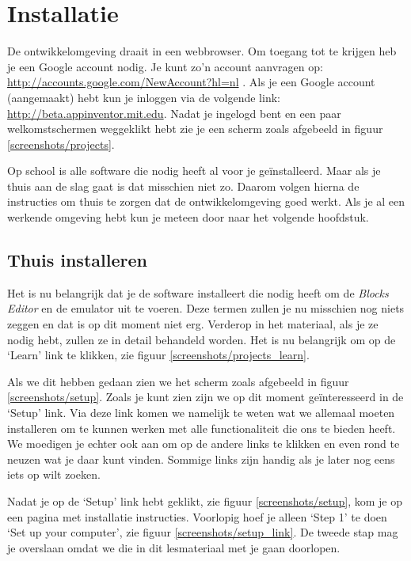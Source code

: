 \chapter{Installatie}

De \ai ontwikkelomgeving draait in een webbrowser. Om toegang tot \ai te krijgen heb je een Google account nodig. Je kunt zo'n account aanvragen op: \url{http://accounts.google.com/NewAccount?hl=nl} . Als je een Google account (aangemaakt) hebt kun je inloggen via de volgende link: \url{http://beta.appinventor.mit.edu}.
Nadat je ingelogd bent en een paar welkomstschermen weggeklikt hebt zie je een scherm zoals afgebeeld in figuur \ref{screenshots/projects}.

 
Op school is alle software die \ai nodig heeft al voor je ge\"installeerd. Maar als je thuis aan de slag gaat is dat misschien niet zo. Daarom volgen hierna de instructies om thuis te zorgen dat de \ai ontwikkelomgeving goed werkt. Als je al een werkende omgeving hebt kun je meteen door naar het volgende hoofdstuk. 

\section{Thuis installeren}
Het is nu belangrijk dat je de software installeert die \ai nodig heeft om de \emph{Blocks Editor} en de emulator uit te voeren. Deze termen zullen je nu misschien nog niets zeggen en dat is op dit moment niet erg. Verderop in het materiaal, als je ze nodig hebt, zullen ze in detail behandeld worden. Het is nu belangrijk om op de `Learn' link te klikken, zie figuur \ref{screenshots/projects_learn}.


Als we dit hebben gedaan zien we het scherm zoals afgebeeld in figuur \ref{screenshots/setup}. Zoals je kunt zien zijn we op dit moment ge\"interesseerd in de `Setup' link. Via deze link komen we namelijk te weten wat we allemaal moeten installeren om te kunnen werken met alle functionaliteit die \ai ons te bieden heeft.
We moedigen je echter ook aan om op de andere links te klikken en even rond te neuzen wat je daar kunt vinden. Sommige links zijn handig als je later nog eens iets op wilt zoeken.


Nadat je op de `Setup' link hebt geklikt, zie figuur \ref{screenshots/setup}, kom je op een pagina met installatie instructies. Voorlopig hoef je alleen `Step 1' te doen `Set up your computer', zie figuur \ref{screenshots/setup_link}.
De tweede stap mag je overslaan omdat we die in dit lesmateriaal met je gaan doorlopen.

